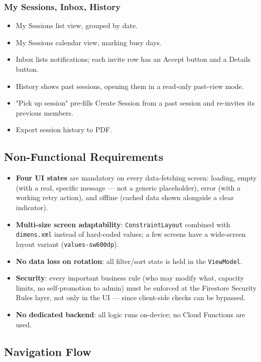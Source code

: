\subsubsection{My Sessions, Inbox, History}
\begin{itemize}
    \item [M] My Sessions list view, grouped by date.
    \item [S] My Sessions calendar view, marking busy days.
    \item [M] Inbox lists notifications; each invite row has an Accept button and a Details button.
    \item [M] History shows past sessions, opening them in a read-only past-view mode.
    \item [S] "Pick up session" pre-fills Create Session from a past session and re-invites its previous members.
    \item [N] Export session history to PDF.
\end{itemize}

\subsection{Non-Functional Requirements}

\begin{itemize}
    \item \textbf{Four UI states} are mandatory on every data-fetching screen: loading, empty (with a real, specific message — not a generic placeholder), error (with a working retry action), and offline (cached data shown alongside a clear indicator).
    \item \textbf{Multi-size screen adaptability}: \texttt{ConstraintLayout} combined with \texttt{dimens.xml} instead of hard-coded values; a few screens have a wide-screen layout variant (\texttt{values-sw600dp}).
    \item \textbf{No data loss on rotation}: all filter/sort state is held in the \texttt{ViewModel}.
    \item \textbf{Security}: every important business rule (who may modify what, capacity limits, no self-promotion to admin) must be enforced at the Firestore Security Rules layer, not only in the UI — since client-side checks can be bypassed.
    \item \textbf{No dedicated backend}: all logic runs on-device; no Cloud Functions are used.
\end{itemize}

\subsection{Navigation Flow}
\label{sec:navflow}

